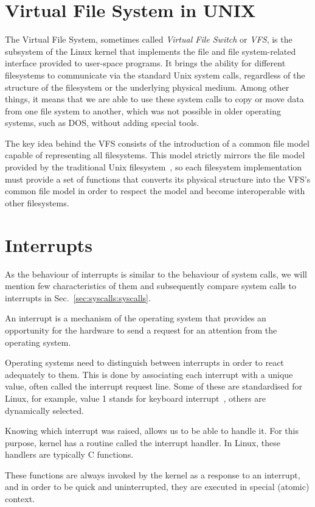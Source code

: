 \section{Virtual File System in UNIX}


The Virtual File System, sometimes called \textit{Virtual File Switch} or \textit{VFS}, is the subsystem of the Linux kernel that implements the file and file system-related interface provided to user-space programs. It brings the ability for different filesystems to communicate via the standard Unix system calls, regardless of the structure of the filesystem or the underlying physical medium. Among other things, it means that we are able to use these system calls to copy or move data from one file system to another, which was not possible in older operating systems, such as DOS, without adding special tools.

The key idea behind the VFS consists of the introduction of a common file model capable of representing all filesystems. This model strictly mirrors the file model provided by the traditional Unix filesystem~\cite{LinuxKernel}, so each filesystem implementation must provide a set of functions that converts its physical structure into the VFS's common file model in order to respect the model and become interoperable with other filesystems.

\section{Interrupts} \label{sec:interrupts}

As the behaviour of interrupts is similar to the behaviour of system calls, we will mention few characteristics of them and subsequently compare system calls to interrupts in Sec.~\ref{sec:syscalls:syscalls}.

An interrupt is a mechanism of the operating system that provides an opportunity for the hardware to send a request for an attention from the operating system.

Operating systems need to distinguish between interrupts in order to react adequately to them. This is done by associating each interrupt with a unique value, often called the interrupt request line. Some of these are standardised for Linux, for example, value 1 stands for keyboard interrupt~\cite{InsideLinux}, others are dynamically selected.

Knowing which interrupt was raised, allows us to be able to handle it. For this purpose, kernel has a routine called the interrupt handler. In Linux, these handlers are typically C functions.

These functions are always invoked by the kernel as a response to an interrupt, and in order to be quick and uninterrupted, they are executed in special (atomic) context.


